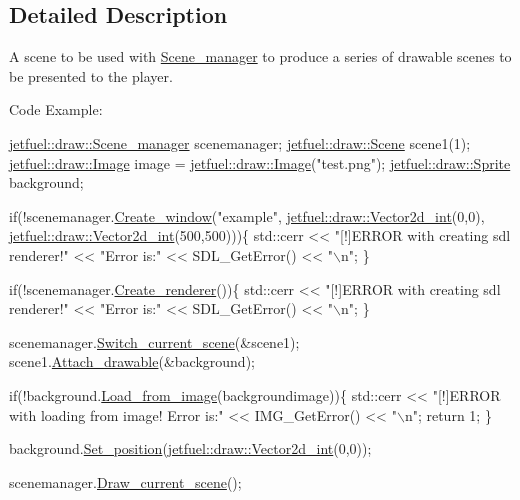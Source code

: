 \subsection{Detailed Description}
A scene to be used with \hyperlink{classjetfuel_1_1draw_1_1Scene__manager}{Scene\+\_\+manager} to produce a series of drawable scenes to be presented to the player.

Code Example\+: 
\begin{DoxyCode}
  \hyperlink{classjetfuel_1_1draw_1_1Scene__manager}{jetfuel::draw::Scene\_manager} scenemanager;
  \hyperlink{classjetfuel_1_1draw_1_1Scene}{jetfuel::draw::Scene} scene1(1);
  \hyperlink{classjetfuel_1_1draw_1_1Image}{jetfuel::draw::Image} image = \hyperlink{classjetfuel_1_1draw_1_1Image}{jetfuel::draw::Image}(\textcolor{stringliteral}{"test.png"});
  \hyperlink{classjetfuel_1_1draw_1_1Sprite}{jetfuel::draw::Sprite} background;

\textcolor{keywordflow}{if}(!scenemanager.\hyperlink{classjetfuel_1_1draw_1_1Scene__manager_a5113e9062c272a22d383ba872417ba31}{Create\_window}(\textcolor{stringliteral}{"example"},
                         \hyperlink{classjetfuel_1_1draw_1_1Vector2d}{jetfuel::draw::Vector2d\_int}(0,0),
                         \hyperlink{classjetfuel_1_1draw_1_1Vector2d}{jetfuel::draw::Vector2d\_int}(500,500)))\{
   std::cerr << \textcolor{stringliteral}{"[!]ERROR with creating sdl renderer!"} <<
   \textcolor{stringliteral}{"Error is:"} << SDL\_GetError() << \textcolor{stringliteral}{"\(\backslash\)n"};
\}

  \textcolor{keywordflow}{if}(!scenemanager.\hyperlink{classjetfuel_1_1draw_1_1Scene__manager_afafecd926ce5e4b2543a6d583a7d24b6}{Create\_renderer}())\{
       std::cerr << \textcolor{stringliteral}{"[!]ERROR with creating sdl renderer!"} <<
      \textcolor{stringliteral}{"Error is:"} << SDL\_GetError() << \textcolor{stringliteral}{"\(\backslash\)n"};
  \}

  scenemanager.\hyperlink{classjetfuel_1_1draw_1_1Scene__manager_a770c163b88ba8427539ee182315ea989}{Switch\_current\_scene}(&scene1);
  scene1.\hyperlink{classjetfuel_1_1draw_1_1Scene_aea4b4c4ae25c30d661be4c52787e0ea3}{Attach\_drawable}(&background);

  \textcolor{keywordflow}{if}(!background.\hyperlink{classjetfuel_1_1draw_1_1Sprite_a370d0b3b2770348ae57ae5156c59a0ca}{Load\_from\_image}(backgroundimage))\{
      std::cerr << \textcolor{stringliteral}{"[!]ERROR with loading from image! Error is:"} << IMG\_GetError() << \textcolor{stringliteral}{"\(\backslash\)n"};
      \textcolor{keywordflow}{return} 1;
  \}

  background.\hyperlink{classjetfuel_1_1draw_1_1Drawable_afdd035afe40c706459a6c9df813bcce6}{Set\_position}(\hyperlink{classjetfuel_1_1draw_1_1Vector2d}{jetfuel::draw::Vector2d\_int}(0,0));

  scenemanager.\hyperlink{classjetfuel_1_1draw_1_1Scene__manager_a8af9a3abfd5121b1b8556342de435773}{Draw\_current\_scene}();
\end{DoxyCode}
 

